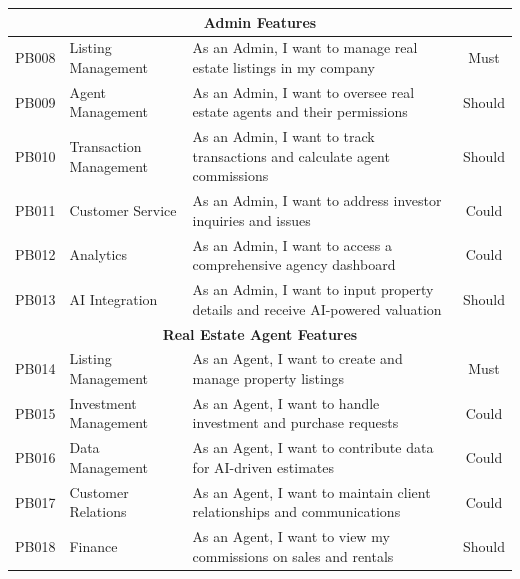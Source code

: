 \begin{longtable}{|c|l|p{8cm}|c|}
    \multicolumn{4}{|c|}{\cellcolor{primary!15}\textbf{\textcolor{primary}{Admin Features}}} \\
    \hline
    PB008 & Listing Management & As an Admin, I want to manage real estate listings in my company & Must \\
    \hline
    PB009 & Agent Management & As an Admin, I want to oversee real estate agents and their permissions & Should \\
    \hline
    PB010 & Transaction Management & As an Admin, I want to track transactions and calculate agent commissions & Should \\
    \hline
    PB011 & Customer Service & As an Admin, I want to address investor inquiries and issues & Could \\
    \hline
    PB012 & Analytics & As an Admin, I want to access a comprehensive agency dashboard & Could \\
    \hline
    PB013 & AI Integration & As an Admin, I want to input property details and receive AI-powered valuation & Should \\
    \hline
    
    \multicolumn{4}{|c|}{\cellcolor{primary!15}\textbf{\textcolor{primary}{Real Estate Agent Features}}} \\
    \hline
    PB014 & Listing Management & As an Agent, I want to create and manage property listings & Must \\
    \hline
    PB015 & Investment Management & As an Agent, I want to handle investment and purchase requests & Could \\
    \hline
    PB016 & Data Management & As an Agent, I want to contribute data for AI-driven estimates & Could \\
    \hline
    PB017 & Customer Relations & As an Agent, I want to maintain client relationships and communications & Could \\
    \hline
    PB018 & Finance & As an Agent, I want to view my commissions on sales and rentals & Should \\
    \hline
    

\end{longtable}
